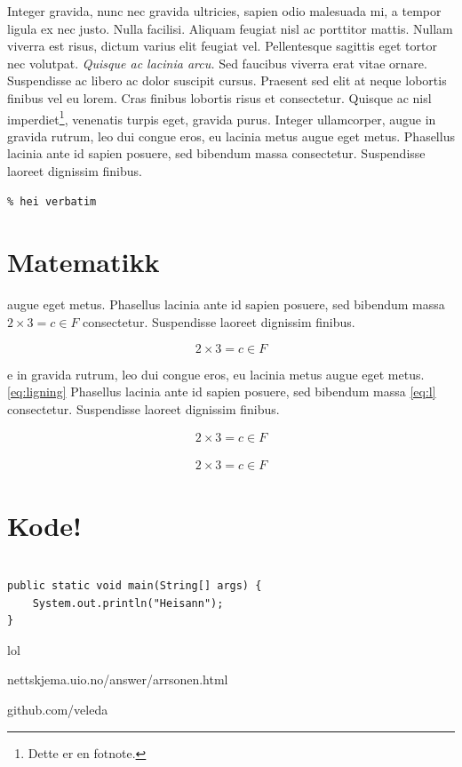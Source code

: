 \documentclass[a4paper, 12pt]{article}
\begin{document}
\newpage


Integer gravida, nunc nec gravida ultricies, sapien odio malesuada mi, a tempor ligula ex nec justo. Nulla facilisi. Aliquam feugiat nisl ac porttitor mattis. Nullam viverra est risus, dictum varius elit feugiat vel. Pellentesque sagittis eget tortor nec volutpat. \emph{Quisque ac lacinia arcu.} Sed faucibus viverra erat vitae ornare. Suspendisse ac libero ac dolor suscipit cursus. Praesent sed elit at neque lobortis finibus vel eu lorem. Cras finibus lobortis risus et consectetur. Quisque ac nisl imperdiet\footnote{Dette er en fotnote.}, venenatis turpis eget, gravida purus. Integer ullamcorper, augue in gravida rutrum, leo dui congue eros, eu lacinia metus augue eget metus. Phasellus lacinia ante id sapien posuere, sed bibendum massa consectetur. Suspendisse laoreet dignissim finibus.

\begin{verbatim}
% hei verbatim
\end{verbatim}

\section{Matematikk}

augue eget metus. Phasellus lacinia ante id sapien posuere, sed bibendum massa $2 \times 3 = c \in F$ consectetur. Suspendisse laoreet dignissim finibus.

$$2 \times 3 = c \in F$$

e in gravida rutrum, leo dui congue eros, eu lacinia metus augue eget metus. \ref{eq:ligning} Phasellus lacinia ante id sapien posuere, sed bibendum massa 
\ref{eq:l}
consectetur. Suspendisse laoreet dignissim finibus.

\begin{align}
2 \times 3 = c \in F
\label{eq:l}
\end{align}

\begin{align}
2 \times 3 = c \in F
\label{eq:ligning}
\end{align}




\newpage

\section{Kode!}

\begin{lstlisting}

public static void main(String[] args) {
	System.out.println("Heisann");
}

\end{lstlisting}








\newpage
lol
\vspace{150pt}

\Huge{nettskjema.uio.no/answer/arrsonen.html}

\Huge{github.com/veleda}
\end{document}
